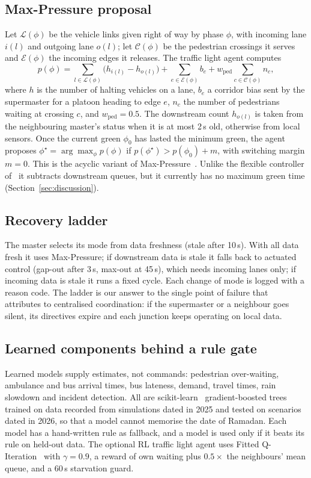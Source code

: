 \documentclass[conference]{IEEEtran}
\begin{document}
\subsection{Max-Pressure proposal}
Let $\mathcal{L}(\phi)$ be the vehicle links given right of way by phase $\phi$, with
incoming lane $i(l)$ and outgoing lane $o(l)$; let $\mathcal{C}(\phi)$ be the pedestrian
crossings it serves and $\mathcal{E}(\phi)$ the incoming edges it releases. The traffic
light agent computes
\begin{equation}
p(\phi) = \sum_{l\in\mathcal{L}(\phi)} \big(h_{i(l)} - h_{o(l)}\big)
        + \sum_{e\in\mathcal{E}(\phi)} b_e
        + w_{\text{ped}} \sum_{c\in\mathcal{C}(\phi)} n_c ,
\label{eq:pressure}
\end{equation}
where $h$ is the number of halting vehicles on a lane, $b_e$ a corridor bias sent by the
supermaster for a platoon heading to edge $e$, $n_c$ the number of pedestrians waiting at
crossing $c$, and $w_{\text{ped}}=0.5$. The downstream count $h_{o(l)}$ is taken from the
neighbouring master's status when it is at most 2\,s old, otherwise from local sensors.
Once the current green $\phi_0$ has lasted the minimum green, the agent proposes
$\phi^\star=\arg\max_\phi p(\phi)$ if $p(\phi^\star) > p(\phi_0)+m$, with switching margin
$m=0$. This is the acyclic variant of Max-Pressure~\cite{varaiya2013maxpressure}. Unlike the
flexible controller of~\cite{riehl2026sumoitscontrol} it subtracts downstream queues, but it
currently has no maximum green time (Section~\ref{sec:discussion}).

\subsection{Recovery ladder}
The master selects its mode from data freshness (stale after 10\,s). With all data fresh it
uses Max-Pressure; if downstream data is stale it falls back to actuated control (gap-out
after 3\,s, max-out at 45\,s), which needs incoming lanes only; if incoming data is stale it
runs a fixed cycle. Each change of mode is logged with a reason code. The ladder is our
answer to the single point of failure that~\cite{azevedo2016jade} attributes to
centralised coordination: if the supermaster or a neighbour goes silent, its directives
expire and each junction keeps operating on local data.

\subsection{Learned components behind a rule gate}
Learned models supply estimates, not commands: pedestrian over-waiting, ambulance and bus
arrival times, bus lateness, demand, travel times, rain slowdown and incident detection.
All are scikit-learn~\cite{pedregosa2011sklearn} gradient-boosted trees trained on data
recorded from simulations dated in 2025 and tested on scenarios dated in 2026, so that a
model cannot memorise the date of Ramadan. Each model has a hand-written rule as fallback,
and a model is used only if it beats its rule on held-out data. The optional RL traffic
light agent uses Fitted Q-Iteration~\cite{ernst2005fqi} with $\gamma=0.9$, a reward of own
waiting plus $0.5\times$ the neighbours' mean queue, and a 60\,s starvation guard.
\end{document}
